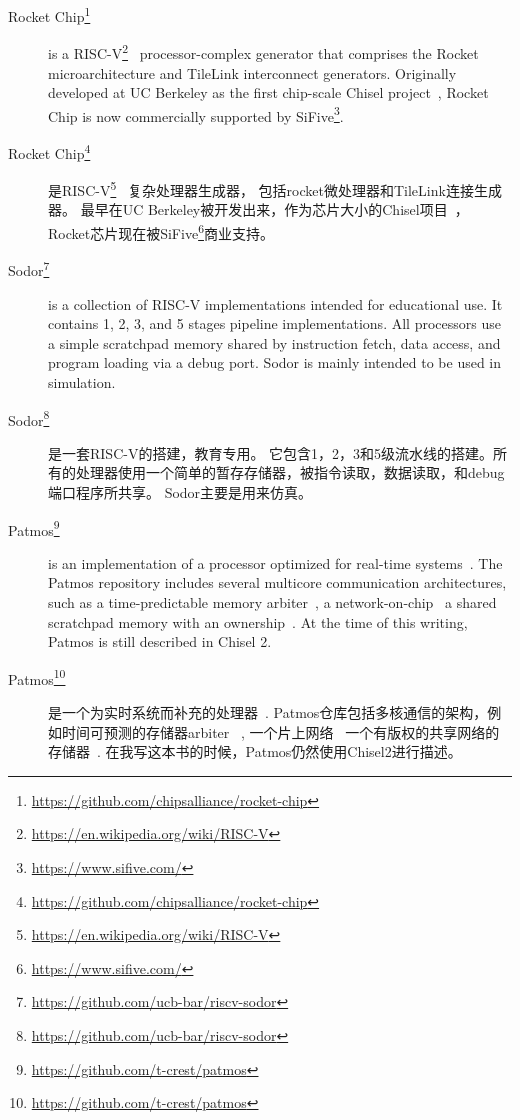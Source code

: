 \documentclass[%
    10pt,
    headinclude, footexclude,
    openright, %
    notitlepage,
    cleardoubleempty,
    headsepline,
    pointlessnumbers,
    bibtotoc, idxtotoc,
    ]{scrbook}
\newcommand{\myref}[2]{\href{#1}{#2}}
\renewcommand{\myref}[2]{{#2}{\footnote{\url{#1}}}}
\begin{document}
{{\begin{description}
\item[\myref{https://github.com/chipsalliance/rocket-chip}{Rocket Chip}]
is a \myref{https://en.wikipedia.org/wiki/RISC-V}{RISC-V}~\cite{risc-v}
processor-complex generator that comprises the Rocket
microarchitecture and TileLink interconnect generators.  Originally developed
at UC Berkeley as the first chip-scale Chisel project~\cite{rocket:techrep}, Rocket Chip is now
commercially supported by \myref{https://www.sifive.com/}{SiFive}.

\item[\myref{https://github.com/chipsalliance/rocket-chip}{Rocket Chip}]
是\myref{https://en.wikipedia.org/wiki/RISC-V}{RISC-V}~\cite{risc-v}
复杂处理器生成器， 包括rocket微处理器和TileLink连接生成器。 
最早在UC Berkeley被开发出来，作为芯片大小的Chisel项目~\cite{rocket:techrep}，
Rocket芯片现在被\myref{https://www.sifive.com/}{SiFive}商业支持。


\item[\myref{https://github.com/ucb-bar/riscv-sodor}{Sodor}] is a collection of RISC-V
implementations intended for educational use. It contains 1, 2, 3, and 5 stages pipeline
implementations. All processors use a simple scratchpad memory shared by instruction
fetch, data access, and program loading via a debug port. Sodor is mainly intended to
be used in simulation.

\item[\myref{https://github.com/ucb-bar/riscv-sodor}{Sodor}]是一套RISC-V的搭建，教育专用。
它包含1，2，3和5级流水线的搭建。所有的处理器使用一个简单的暂存存储器，被指令读取，数据读取，和debug端口程序所共享。
Sodor主要是用来仿真。

\item[\myref{https://github.com/t-crest/patmos}{Patmos}] is an implementation of a
processor optimized for real-time systems~\cite{patmos:rts2018}. The Patmos repository
includes several multicore communication architectures, such as a time-predictable memory
arbiter~\cite{t-crest:memnoc}, a network-on-chip~\cite{s4nocni:arcs2019}
a shared scratchpad memory with an ownership~\cite{t-crest:ownspm}.
At the time of this writing, Patmos is still described in Chisel 2.

\item[\myref{https://github.com/t-crest/patmos}{Patmos}] 是一个为实时系统而补充的处理器~\cite{patmos:rts2018}.
Patmos仓库包括多核通信的架构，例如时间可预测的存储器arbiter~\cite{t-crest:memnoc}
, 一个片上网络~\cite{s4nocni:arcs2019}
一个有版权的共享网络的存储器~\cite{t-crest:ownspm}.
在我写这本书的时候，Patmos仍然使用Chisel2进行描述。


\end{description}}}
\end{document}
